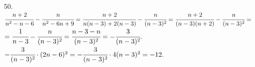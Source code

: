 50. $\cfrac{n+2}{n^2-n-6}-\cfrac{n}{n^2-6n+9}=\cfrac{n+2}{n(n-3)+2(n-3)}-\cfrac{n}{(n-3)^2}=\cfrac{n+2}{(n-3)(n+2)}-\cfrac{n}{(n-3)^2}=$\\
$=\cfrac{1}{n-3}-\cfrac{n}{(n-3)^2}=\cfrac{n-3-n}{(n-3)^2}=-\cfrac{3}{(n-3)^2}.$\\
$-\cfrac{3}{(n-3)^2}\cdot(2n-6)^2=-\cfrac{3}{(n-3)^2}\cdot4(n-3)^2=-12.$\\
